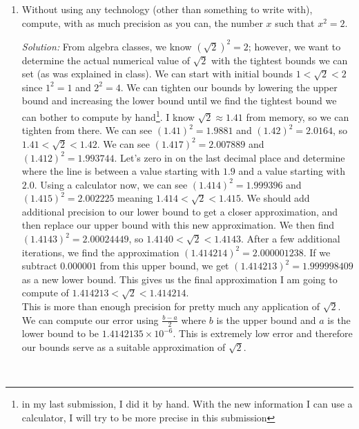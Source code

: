 \documentclass[10pt]{article}
\newcommand{\solution}{\color{blue}\textit{Solution:} \color{black} }
\begin{document}
\begin{enumerate}
        \solution The intent with this proof is to show there are always more primes than a set of primes contains;
however, it is not motivated why if the number $N$ is not prime, then it must have $A, B$ or $C$ as a divisor.
This proof is almost correct; however, the phrase ``If it is not prime, then it has $A, B$ or $C$ as a divisor''
should be replaced with something like ``$N$’s prime factorization will contain a prime $D$ which is unique
from $A, B$ and $C$''. With this fix, this proof is now suitable for showing that given a set of prime numbers,
there is always another prime number not included in the provided set.
		
		\item  Without using any technology (other than something to write with), compute, with as much precision as you can, the number $x$ such that $x^2 = 2$.   
		
            \solution From algebra classes, we know $(\sqrt{2})^2 = 2$; however, we want to determine the actual numerical
            value of $\sqrt{2}$ with the tightest bounds we can set (as was explained in class). We can start with initial
            bounds $1 < \sqrt{2} < 2$ since $1^2 = 1$ and $2^2 = 4$. We can tighten our bounds by lowering the upper bound and
            increasing the lower bound until we find the tightest bound we can bother to compute by hand\footnote{in my last submission, I did it by hand. With the new information I can use a calculator, I will try to be more precise in this submission}. I know $\sqrt{2} \approx 1.41$ from memory, so we can tighten from there. We can see $(1.41)^2 = 1.9881$ and $(1.42)^2 = 2.0164$,
            so $1.41 < \sqrt{2} < 1.42$. We can see $(1.417)^2 = 2.007889$ and $(1.412)^2 = 1.993744$. Let's zero in on the last decimal place and determine where the line is between a value starting with $1.9$ and a value starting with $2.0$. Using a calculator now, we can see $(1.414)^2 = 1.999396$ and $(1.415)^2 = 2.002225$ meaning $1.414 < \sqrt{2} < 1.415$. We should add additional precision to our lower bound to get a closer approximation, and then replace our upper bound with this new approximation. We then find $(1.4143)^2 = 2.00024449$, so $1.4140 < \sqrt{2} < 1.4143$. After a few additional iterations, we find the approximation $(1.414214)^2 = 2.000001238$. If we subtract $0.000001$ from this upper bound, we get $(1.414213)^2 = 1.999998409$ as a new lower bound. This gives us the final approximation I am going to compute of $1.414213 < \sqrt{2} < 1.414214$.\\

            This is more than enough precision for pretty much any application of $\sqrt{2}$. We can compute our error using $\frac{b - a}{2}$ where $b$ is the upper bound and $a$ is the lower bound to be $1.4142135 \times 10^{-6}$. This is extremely low error and therefore our bounds serve as a suitable approximation of $\sqrt{2}$.
		
	\end{enumerate}
	


\noindent \underline{\hspace{3in}}\\
\end{document}
